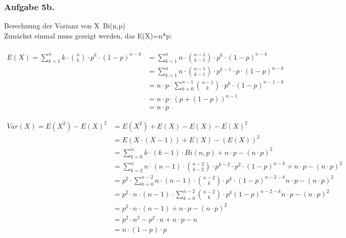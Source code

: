 \documentclass[a4paper,12pt]{article}
\newcommand{\ex}[1]{\newpage\subsubsection*{Aufgabe #1.}}
\begin{document}
	\ex{5b}

	Berechnung der Varianz von  X~Bi(n,p)\\
	
	Zunächst einmal muss gezeigt werden, das E(X)=n*p:\\\\
	\begin{align*}
	E(X) = \sum_{k=1}^{n} k \cdot \binom{n}{k} \cdot p^{k} \cdot (1-p)^{n-k}
	&= \sum_{k=1}^{n} n \cdot \binom{n-1}{k-1} \cdot p^{k} \cdot (1-p)^{n-k}\\
	&= \sum_{k=1}^{n} n \cdot \binom{n-1}{k-1} \cdot p^{k-1} \cdot p \cdot (1-p)^{n-k}\\
	&= n \cdot p \cdot \sum_{k=0}^{n-1} \binom{n-1}{k} \cdot p^{k} \cdot (1-p)^{n-1-k}\\
	&= n \cdot p \cdot (p + (1-p))^{n-1}\\
	&= n \cdot p
	\end{align*}
	
	\begin{align*}
	Var(X)= E(X^{2})-E(X)^{2}
	&=E(X^{2})+E(X)-E(X)-E(X)^{2}\\
	&=E(X \cdot (X-1)) + E(X) - (E(X))^{2}\\
	&= \sum_{k=0}^{n} k \cdot (k-1) \cdot Bi(n,p) + n \cdot p - (n \cdot p)^{2}\\
	&= \sum_{k=2}^{n} n \cdot (n-1) \cdot \binom{n-2}{k-2} \cdot p^{k-2} \cdot p^{2} \cdot (1-p)^{n-k} + n \cdot p - (n \cdot p)^{2} \\
	&= p^{2} \cdot \sum_{k=0 }^{n-2} n \cdot (n-1) \cdot \binom{n-2}{k} \cdot p^{k} \cdot (1-p)^{n-2-k} n \cdot p - (n \cdot p)^{2} \\
	&= p^{2} \cdot n \cdot (n-1) \cdot \sum_{k=0}^{n-2} \binom{n-2}{k} \cdot p^{k} (1-p)^{n-2-k} n \cdot p - (n \cdot p)^{2}\\
	&= p^{2} \cdot n \cdot(n-1) + n \cdot p - (n \cdot p)^{2}\\
	&= p^{2} \cdot n^{2} - p^{2} \cdot n + n \cdot p - n \\
	&= n \cdot (1-p) \cdot p
	\end{align*}
	
\end{document}
